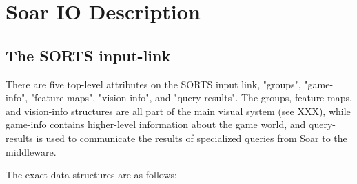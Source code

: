 
\section{Soar IO Description}

\subsection{The SORTS input-link}

There are five top-level attributes on the SORTS input link, "groups", "game-info", "feature-maps", "vision-info", and "query-results". The groups, feature-maps, and vision-info structures are all part of the main visual system (see XXX), while game-info contains higher-level information about the game world, and query-results is used to communicate the results of specialized queries from Soar to the middleware.

The exact data structures are as follows:

